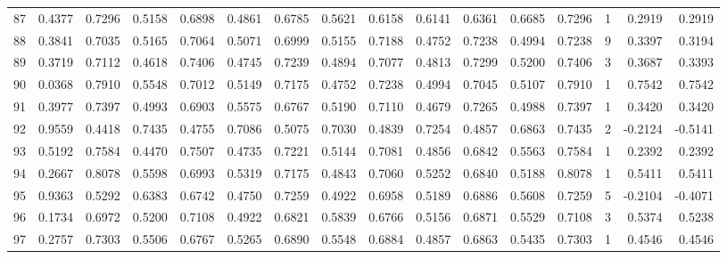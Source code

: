 \begin{tabular}{lrrrrrrrrrrrrrrr}
87  &      0.4377 &  0.7296 &  0.5158 &  0.6898 &  0.4861 &  0.6785 &  0.5621 &  0.6158 &  0.6141 &  0.6361 &   0.6685 &     0.7296 &      1 &                    0.2919 &                     0.2919 \\
88  &      0.3841 &  0.7035 &  0.5165 &  0.7064 &  0.5071 &  0.6999 &  0.5155 &  0.7188 &  0.4752 &  0.7238 &   0.4994 &     0.7238 &      9 &                    0.3397 &                     0.3194 \\
89  &      0.3719 &  0.7112 &  0.4618 &  0.7406 &  0.4745 &  0.7239 &  0.4894 &  0.7077 &  0.4813 &  0.7299 &   0.5200 &     0.7406 &      3 &                    0.3687 &                     0.3393 \\
90  &      0.0368 &  0.7910 &  0.5548 &  0.7012 &  0.5149 &  0.7175 &  0.4752 &  0.7238 &  0.4994 &  0.7045 &   0.5107 &     0.7910 &      1 &                    0.7542 &                     0.7542 \\
91  &      0.3977 &  0.7397 &  0.4993 &  0.6903 &  0.5575 &  0.6767 &  0.5190 &  0.7110 &  0.4679 &  0.7265 &   0.4988 &     0.7397 &      1 &                    0.3420 &                     0.3420 \\
92  &      0.9559 &  0.4418 &  0.7435 &  0.4755 &  0.7086 &  0.5075 &  0.7030 &  0.4839 &  0.7254 &  0.4857 &   0.6863 &     0.7435 &      2 &                   -0.2124 &                    -0.5141 \\
93  &      0.5192 &  0.7584 &  0.4470 &  0.7507 &  0.4735 &  0.7221 &  0.5144 &  0.7081 &  0.4856 &  0.6842 &   0.5563 &     0.7584 &      1 &                    0.2392 &                     0.2392 \\
94  &      0.2667 &  0.8078 &  0.5598 &  0.6993 &  0.5319 &  0.7175 &  0.4843 &  0.7060 &  0.5252 &  0.6840 &   0.5188 &     0.8078 &      1 &                    0.5411 &                     0.5411 \\
95  &      0.9363 &  0.5292 &  0.6383 &  0.6742 &  0.4750 &  0.7259 &  0.4922 &  0.6958 &  0.5189 &  0.6886 &   0.5608 &     0.7259 &      5 &                   -0.2104 &                    -0.4071 \\
96  &      0.1734 &  0.6972 &  0.5200 &  0.7108 &  0.4922 &  0.6821 &  0.5839 &  0.6766 &  0.5156 &  0.6871 &   0.5529 &     0.7108 &      3 &                    0.5374 &                     0.5238 \\
97  &      0.2757 &  0.7303 &  0.5506 &  0.6767 &  0.5265 &  0.6890 &  0.5548 &  0.6884 &  0.4857 &  0.6863 &   0.5435 &     0.7303 &      1 &                    0.4546 &                     0.4546 \\

\end{tabular}
